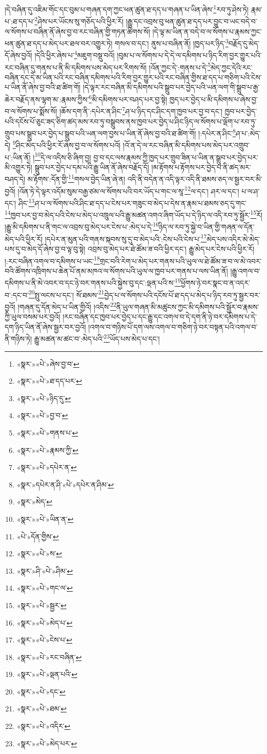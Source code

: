 །དེ་བཞིན་དུ་འཇིམ་གོང་དང་བུམ་པ་གཞན་དག་ཀྱང་ཕན་ཚུན་ཐ་དད་པ་གཞན་པ་ཡིན་ཞེས་\footnote{«སྣར་»«པེ་»ཞེས་བྱ་བ་}རབ་ཏུ་ཤེས་ཏེ། རྣམ་པ་:ཐ་དད་པ་\footnote{«སྣར་»«པེ་»ཐ་དད་པར་}ཤེས་པར་ཡོངས་སུ་གཅོད་པའི་ཕྱིར་རོ། །རྒྱུ་དང་འབྲས་བུ་ཕན་ཚུན་ཐ་དད་པར་བྱུང་བ་ཡང་བདེ་བ་ལ་སོགས་པ་བཞིན་ནོ་ཞེས་བྱ་བ་རང་བཞིན་གྱི་གཏན་ཚིགས་སོ། །དེ་ལྟ་མ་ཡིན་ན་བདེ་བ་ལ་སོགས་པ་རྣམས་ཀྱང་ཕན་ཚུན་ཐ་དད་པ་མེད་པར་ཐལ་བར་འགྱུར་ཏེ། གསལ་བ་དང་། ནུས་པ་བཞིན་ནོ། །ཁྱད་པར་ཉིད་\footnote{«སྣར་»«པེ་»ཉིད་དུ་}བརྗོད་དུ་མེད་དོ་ཞེས་བྱའོ། །དེའི་ཕྱིར་ཞེས་པ་\footnote{«སྣར་»«པེ་»བྱ་བ་}མཇུག་བསྡུ་བའོ། །བུམ་པ་ལ་སོགས་པ་དེ་དེ་ལ་དམིགས་པ་ཉིད་རིག་བྱར་གྱུར་པའི་རང་བཞིན་དུ་གནས་པ་ནི་མི་དམིགས་པས་མེད་པར་རིགས་སོ། །འོན་ཀྱང་དེ་:གནས་པ་དེ་\footnote{«སྣར་»«པེ་»གནས་པ་}མེད་ཀྱང་དེའི་རང་བཞིན་དང་དེ་མ་ཡིན་པའི་རང་བཞིན་དམིགས་པའི་རིག་བྱར་གྱུར་པའི་རང་བཞིན་གྱིས་ཐ་དད་པ་གཅིག་པའི་ངེས་པ་ཡིན་ནོ་ཞེས་བྱ་བའི་ཐ་ཚིག་གོ། །དེ་ལྟར་རང་བཞིན་མི་དམིགས་པའི་སྒྲུབ་པར་བྱེད་པའི་ཡན་ལག་གི་སྒྲུབ་པ་རྒྱ་ཆེར་བརྗོད་ནས་ལྷག་མ་:རྣམས་ཀྱིས་\footnote{«སྣར་»«པེ་»རྣམས་ཀྱི་}མི་དམིགས་པར་བཤད་པར་བྱ་སྟེ། ཁྱད་པར་བྱེད་པ་མི་དམིགས་པ་ཞེས་བྱ་བ་ལ་སོགས་པ་སྨོས་སོ། །ཆོས་དག་ནི་:དཔེར་ན་ཤིང་\footnote{«སྣར་»«པེ་»དཔེར་ན་}ཤ་པ་ཉིད་དང་ཤིང་དག་ཁྱབ་པར་བྱ་བ་དང་། ཁྱབ་པར་བྱེད་པའི་དངོས་པོ་ཅུང་ཟད་ཅིག་ཚད་མས་རབ་ཏུ་བསྒྲུབས་ནས་ཁྱབ་པར་བྱེད་པ་ཤིང་ཉིད་ལ་སོགས་པ་ལྡོག་པ་རབ་ཏུ་གྲུབ་པས་སྒྲུབ་པར་བྱེད་པ་སྒྲུབ་པའི་ཡན་ལག་བྱས་པ་ཡིན་ནོ་ཞེས་བྱ་བའི་ཐ་ཚིག་གོ། །:དཔེར་ན་ཤིང་\footnote{«སྣར་»དཔེར་ན་ཤི་«པེ་»དཔེར་ན་ཤིམ་}ཤ་པ་:མེད་དེ། \footnote{«སྣར་»མེད་}ཤིང་མེད་པའི་ཕྱིར་རོ་ཞེས་བྱ་བ་ལ་སོགས་པའོ། །འོ་ན་དེ་ལ་རང་བཞིན་མི་དམིགས་པས་མེད་པར་འགྲུབ་པ་:ཡིན་ནོ། །\footnote{«སྣར་»«པེ་»ཡིན་ན་}དེ་ལ་འདིས་ཅི་ཞིག་བྱ། བྱ་བ་དང་ལས་རྣམས་ཀྱི་ཁྱད་པར་གྲུབ་ཟིན་པ་ཡིན་ན་སྒྲུབ་པར་བྱེད་པར་མི་འགྱུར་ཏེ། སྒྲུབ་པར་བྱེད་པ་དམ་པའི་རྒྱུ་ཡིན་ནོ་ཞེས་བརྗོད་དོ། །མ་རྟོགས་པ་རྟོགས་པར་བྱེད་པ་ནི་ཚད་མར་བཤད་དེ། མ་རྟོགས་:དོན་གྱི་\footnote{«པེ་»དོན་གྱིས་}གསལ་བྱེད་ཡིན་ཞེ་ན། འདི་ནི་བདེན་ན་འདི་ལྟར་འདི་ནི་ཐམས་ཅད་ལ་སྦྱར་བར་མི་བྱའོ། །འོན་ཏེ་དེ་ལྟར་འདོམ་སུམ་བརྒྱ་ཙམ་ལ་སོགས་པའི་བར་ཡོད་པ་གང་ལ་སཱ་\footnote{«སྣར་»«པེ་»ས་}ལ་དང་། ཤར་ལ་དང་། པ་ལ་ཤ་དང་། ཤིང་\footnote{«སྣར་»ཤི་«པེ་»ཤིམ་}ཤ་པ་ལ་སོགས་པའི་ཤིང་ཐ་དད་པ་ངེས་པར་གཟུང་བ་མེད་པ་དེས་ན་རྣམ་པ་ཐམས་ཅད་དུ་གང་\footnote{«སྣར་»«པེ་»གང་ལ་}ཁྱབ་པར་བྱ་བ་མེད་པའི་ངེས་པ་མེད་པ་འཁྲུལ་པའི་རྒྱུ་མཚན་འགའ་ཞིག་ཡོད་པ་དེ་ཉིད་ལ་འདི་རབ་ཏུ་སྦྱོར་\footnote{«སྣར་»«པེ་»སྦྱར་}རོ། །རྒྱུ་མི་དམིགས་པ་ནི་གང་ལ་འབྲས་བུ་མེད་པར་ངེས་པ་:མེད་པ་དེ་\footnote{«སྣར་»«པེ་»མེད་པ་}ཉིད་ལ་རབ་ཏུ་སྐྱེ་བ་ཡིན་གྱི་གཞན་ལ་དོན་མེད་པའི་ཕྱིར་རོ། །དཔེར་ན་མུན་པའི་གནས་སྐབས་སུ་དུ་བ་མེད་པའི་:ངེས་པའི་ངེས་པ་\footnote{«སྣར་»«པེ་»ངེས་པ་}མེད་པས་འདིར་མེ་མེད་པས་དུ་བ་མེད་དོ་ཞེས་བྱ་བ་ལྟ་བུ་སྟེ། འབྲས་བུ་མེད་པར་ཐེ་ཚོམ་ཟ་བའི་ཕྱིར་དང་། རྒྱུ་མེད་པར་ངེས་པའི་ཕྱིར་རོ། །:རང་བཞིན་འགལ་བ་དམིགས་པ་ཡང་\footnote{«སྣར་»«པེ་»རང་བཞིན་}གྲང་བའི་རེག་པ་མེད་པར་གནས་པའི་ཡུལ་ལ་ཐེ་ཚོམ་ཟ་བ་ལ་མེ་འབར་བའི་ཚོགས་འཁྲིགས་པ་ཆེན་པོ་ནམ་མཁའ་ལ་སོགས་པའི་ཡུལ་ལ་ཁྱབ་པར་གནས་པ་ལས་ཡིན་ནོ། །རྒྱུ་འགལ་བ་དམིགས་པ་ནི་མེ་འབར་བ་དང་ཉེ་བར་གནས་པའི་སྐྱེས་བུ་དང་:ལྡན་པའི་ས་\footnote{«སྣར་»«པེ་»ལྡན་པའི་}ཕྱོགས་ཉེ་བར་སྣང་བ་ན་འདར་བ་:དང་བ་\footnote{«སྣར་»«པེ་»དང་}སྤུ་ལངས་པ་དང་། སོ་ཐམས་\footnote{«སྣར་»«པེ་»ཐམ་}བྱེད་པ་ལ་སོགས་པའི་དངོས་པོ་ཐ་དད་པ་མེད་པ་ཉིད་རབ་ཏུ་སྦྱར་བར་བྱའོ། །གཞན་དུ་དོན་མེད་པ་ཡིན་གྱིའོ། །འདིས་\footnote{«སྣར་»«པེ་»འདིར་}ནི་ཡུལ་གཞན་མི་མཚུངས་ཀྱང་མི་དམིགས་པའི་སྦྱོར་བ་རྣམས་ཀྱི་ཡུལ་བསམ་པར་བྱའོ། །རང་བཞིན་དང་ཁྱབ་པར་བྱེད་པ་དང་རྒྱུ་དང་འགལ་བ་དེ་དག་ནི་ཉེ་བར་དམིགས་པ་དེ་དག་ཉིད་ཡིན་ནོ་ཞེས་སྦྱར་བར་བྱའོ། །འགལ་བ་གཉིས་པོ་དག་ལས་འགལ་བ་གཅིག་ཉེ་བར་བསྟན་པའི་འགལ་བ་ནི་གཉིས་ཏེ། རྒྱུ་མཚན་མ་ཚང་བ་:མེད་པའི་\footnote{«སྣར་»«པེ་»མེད་པར་}ཡོད་པས་མེད་པ་དང་། 